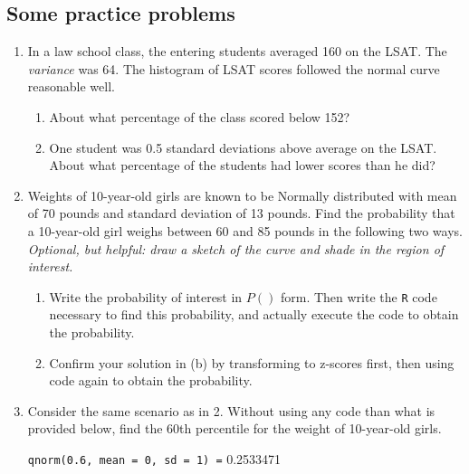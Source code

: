 \documentclass[
  letterpaper,
  DIV=11,
  numbers=noendperiod]{scrartcl}
\begin{document}
\hypertarget{some-practice-problems}{%
\subsection{Some practice problems}\label{some-practice-problems}}

\begin{enumerate}
\def\labelenumi{\arabic{enumi}.}
\item
  In a law school class, the entering students averaged 160 on the LSAT.
  The \emph{variance} was 64. The histogram of LSAT scores followed the
  normal curve reasonable well.

  \begin{enumerate}
  \def\labelenumii{\alph{enumii}.}
  \item
    About what percentage of the class scored below 152?
  \item
    One student was 0.5 standard deviations above average on the LSAT.
    About what percentage of the students had lower scores than he did?
  \end{enumerate}
\item
  Weights of 10-year-old girls are known to be Normally distributed with
  mean of 70 pounds and standard deviation of 13 pounds. Find the
  probability that a 10-year-old girl weighs between 60 and 85 pounds in
  the following two ways. \emph{Optional, but helpful: draw a sketch of
  the curve and shade in the region of interest.}

  \begin{enumerate}
  \def\labelenumii{\alph{enumii}.}
  \item
    Write the probability of interest in \(P()\) form. Then write the
    \texttt{R} code necessary to find this probability, and actually
    execute the code to obtain the probability.
  \item
    Confirm your solution in (b) by transforming to z-scores first, then
    using code again to obtain the probability.
  \end{enumerate}
\item
  Consider the same scenario as in 2. Without using any code than what
  is provided below, find the 60th percentile for the weight of
  10-year-old girls.

  \texttt{qnorm(0.6,\ mean\ =\ 0,\ sd\ =\ 1)\ =} 0.2533471
\end{enumerate}
\end{document}
